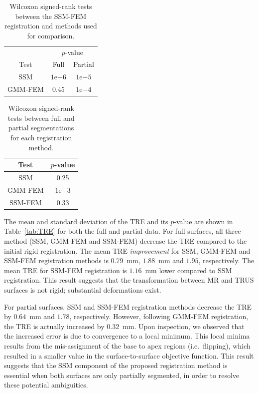 \documentclass[journal]{IEEEtran}
\newcommand{\eng}[2]{#1\mathrm{e}{#2}}
\begin{document}
\begin{table}[t]
\begin{center}
\caption{Wilcoxon signed-rank tests between the SSM-FEM registration and methods used for comparison.}
\centering
\begin{tabular}{c| c| c}
	\hline
	& \multicolumn{2}{c}{$p$-value}\\
	\cline{2-3}
	Test & Full & Partial\\
	\hline
	SSM & $\eng{1}{-6}$ & $\eng{1}{-5}$ \\
	\hline
	GMM-FEM & 0.45 & $\eng{1}{-4}$ \\
   \hline
\end{tabular}
\label{tab:stat1}
\end{center}
\end{table}
\begin{table}[t]
\begin{center}
\caption{Wilcoxon signed-rank tests between full and partial segmentations for each registration method.}
\centering
\begin{tabular}{c| c}
	\hline
	Test & $p$-value\\
	\hline
	SSM & 0.25\\
	\hline
	GMM-FEM & $\eng{1}{-3}$\\
	\hline
	SSM-FEM & 0.33\\
   \hline
\end{tabular}
\label{tab:stat2}
\end{center}
\end{table}


The mean and standard deviation of the TRE and its $p$-value are shown in Table~\ref{tab:TRE} for both the full and partial data. For full surfaces, all three method (SSM, GMM-FEM and SSM-FEM) decrease the TRE compared to the initial rigid registration. The mean TRE \textit{improvement} for SSM, GMM-FEM and SSM-FEM registration methods is $0.79$~mm, $1.88$~mm and $1.95$, respectively. The mean TRE for SSM-FEM registration is $1.16$~mm lower compared to SSM registration. This result suggests that the transformation between MR and TRUS surfaces is not rigid; substantial deformations exist. 

For partial surfaces, SSM and SSM-FEM registration methods decrease the TRE by $0.64$~mm and $1.78$, respectively. However, following GMM-FEM registration, the TRE is actually increased by $0.32$~mm. Upon inspection, we observed that the increased error is due to convergence to a local minimum. This local minima results from the mis-assignment of the base to apex regions (i.e.~flipping), which resulted in a smaller value in the surface-to-surface objective function. This result suggests that the SSM component of the proposed registration method is essential when both surfaces are only partially segmented, in order to resolve these potential ambiguities.
\end{document}
